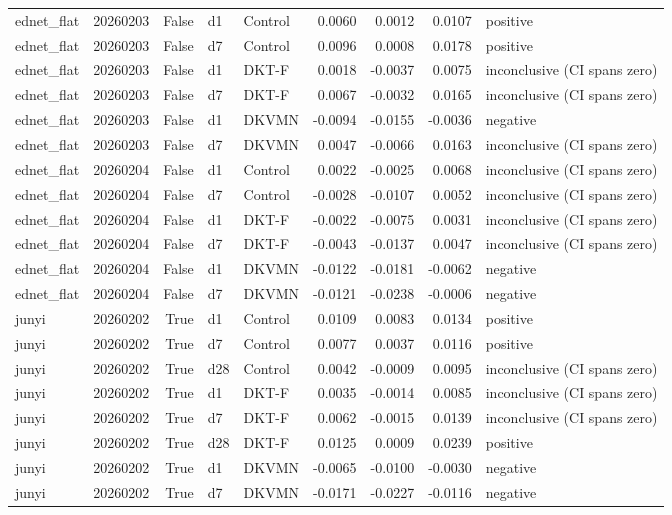 \begin{tabular}{lrrllrrrl}
ednet\_flat & 20260203 & False & d1 & Control & 0.0060 & 0.0012 & 0.0107 & positive \\
ednet\_flat & 20260203 & False & d7 & Control & 0.0096 & 0.0008 & 0.0178 & positive \\
ednet\_flat & 20260203 & False & d1 & DKT-F & 0.0018 & -0.0037 & 0.0075 & inconclusive (CI spans zero) \\
ednet\_flat & 20260203 & False & d7 & DKT-F & 0.0067 & -0.0032 & 0.0165 & inconclusive (CI spans zero) \\
ednet\_flat & 20260203 & False & d1 & DKVMN & -0.0094 & -0.0155 & -0.0036 & negative \\
ednet\_flat & 20260203 & False & d7 & DKVMN & 0.0047 & -0.0066 & 0.0163 & inconclusive (CI spans zero) \\
ednet\_flat & 20260204 & False & d1 & Control & 0.0022 & -0.0025 & 0.0068 & inconclusive (CI spans zero) \\
ednet\_flat & 20260204 & False & d7 & Control & -0.0028 & -0.0107 & 0.0052 & inconclusive (CI spans zero) \\
ednet\_flat & 20260204 & False & d1 & DKT-F & -0.0022 & -0.0075 & 0.0031 & inconclusive (CI spans zero) \\
ednet\_flat & 20260204 & False & d7 & DKT-F & -0.0043 & -0.0137 & 0.0047 & inconclusive (CI spans zero) \\
ednet\_flat & 20260204 & False & d1 & DKVMN & -0.0122 & -0.0181 & -0.0062 & negative \\
ednet\_flat & 20260204 & False & d7 & DKVMN & -0.0121 & -0.0238 & -0.0006 & negative \\
junyi & 20260202 & True & d1 & Control & 0.0109 & 0.0083 & 0.0134 & positive \\
junyi & 20260202 & True & d7 & Control & 0.0077 & 0.0037 & 0.0116 & positive \\
junyi & 20260202 & True & d28 & Control & 0.0042 & -0.0009 & 0.0095 & inconclusive (CI spans zero) \\
junyi & 20260202 & True & d1 & DKT-F & 0.0035 & -0.0014 & 0.0085 & inconclusive (CI spans zero) \\
junyi & 20260202 & True & d7 & DKT-F & 0.0062 & -0.0015 & 0.0139 & inconclusive (CI spans zero) \\
junyi & 20260202 & True & d28 & DKT-F & 0.0125 & 0.0009 & 0.0239 & positive \\
junyi & 20260202 & True & d1 & DKVMN & -0.0065 & -0.0100 & -0.0030 & negative \\
junyi & 20260202 & True & d7 & DKVMN & -0.0171 & -0.0227 & -0.0116 & negative \\

\end{tabular}
